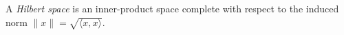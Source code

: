 
A \emph{Hilbert space} is an inner-product space complete with respect to the induced norm $\|x\|=\sqrt{\langle x,x\rangle}$.
